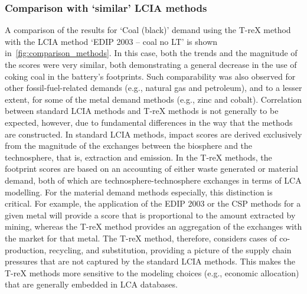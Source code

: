 \documentclass[a4paper,fleqn]{cas-dc}
\begin{document}
\subsubsection{Comparison with `similar' LCIA methods}\label{sec:results-case_study-methodcomparison}

A comparison of the results for `Coal (black)' demand using the T-reX method
with the LCIA method `EDIP 2003 – coal no LT' is shown
in~\autoref{fig:comparison_methods}. In this case, both the trends and the
magnitude of the scores were very similar, both demonstrating a general
decrease in the use of coking coal in the battery's footprints. Such
comparability was also observed for other fossil-fuel-related demands (e.g.,
natural gas and petroleum), and to a lesser extent, for some of the metal
demand methods (e.g., zinc and cobalt). Correlation between standard LCIA
methods and T-reX methods is not generally to be expected, however, due to
fundamental differences in the way that the methods are constructed. In
standard LCIA methods, impact scores are derived exclusively from the magnitude
of the exchanges between the biosphere and the technosphere, that is,
extraction and emission. In the T-reX methods, the footprint scores are based
on an accounting of either waste generated or material demand, both of which
are technosphere-technosphere exchanges in terms of LCA modelling. For the
material demand methods especially, this distinction is critical. For example,
the application of the EDIP 2003 or the CSP methods for a given metal will
provide a score that is proportional to the amount extracted by mining, whereas
the T-reX method provides an aggregation of the exchanges with the market for
that metal. The T-reX method, therefore, considers cases of co-production,
recycling, and substitution, providing a picture of the supply chain pressures
that are not captured by the standard LCIA methods. This makes the T-reX
methods more sensitive to the modeling choices (e.g., economic allocation) that
are generally embedded in LCA databases.
\end{document}

